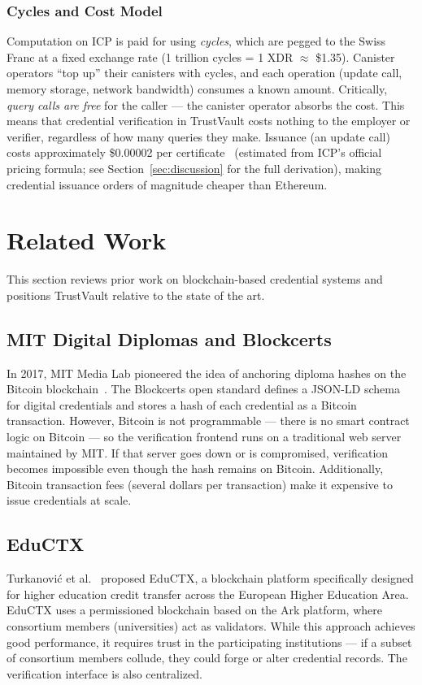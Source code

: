 \documentclass[journal]{IEEEtran}
\begin{document}
\subsubsection{Cycles and Cost Model}
Computation on ICP is paid for using \emph{cycles}, which are pegged to the Swiss Franc at a fixed exchange rate (1 trillion cycles = 1 XDR $\approx$ \$1.35). Canister operators ``top up'' their canisters with cycles, and each operation (update call, memory storage, network bandwidth) consumes a known amount. Critically, \emph{query calls are free} for the caller — the canister operator absorbs the cost. This means that credential verification in TrustVault costs nothing to the employer or verifier, regardless of how many queries they make. Issuance (an update call) costs approximately \$0.00002 per certificate~\cite{dfinity2025gascost} (estimated from ICP's official pricing formula; see Section~\ref{sec:discussion} for the full derivation), making credential issuance orders of magnitude cheaper than Ethereum.

\section{Related Work}
\label{sec:related}

This section reviews prior work on blockchain-based credential systems and positions TrustVault relative to the state of the art.

\subsection{MIT Digital Diplomas and Blockcerts}
In 2017, MIT Media Lab pioneered the idea of anchoring diploma hashes on the Bitcoin blockchain~\cite{grech2017blockchain}. The Blockcerts open standard defines a JSON-LD schema for digital credentials and stores a hash of each credential as a Bitcoin transaction. However, Bitcoin is not programmable — there is no smart contract logic on Bitcoin — so the verification frontend runs on a traditional web server maintained by MIT. If that server goes down or is compromised, verification becomes impossible even though the hash remains on Bitcoin. Additionally, Bitcoin transaction fees (several dollars per transaction) make it expensive to issue credentials at scale.

\subsection{EduCTX}
Turkanovi\'{c} et al.~\cite{turk2018eductx} proposed EduCTX, a blockchain platform specifically designed for higher education credit transfer across the European Higher Education Area. EduCTX uses a permissioned blockchain based on the Ark platform, where consortium members (universities) act as validators. While this approach achieves good performance, it requires trust in the participating institutions — if a subset of consortium members collude, they could forge or alter credential records. The verification interface is also centralized.
\end{document}
